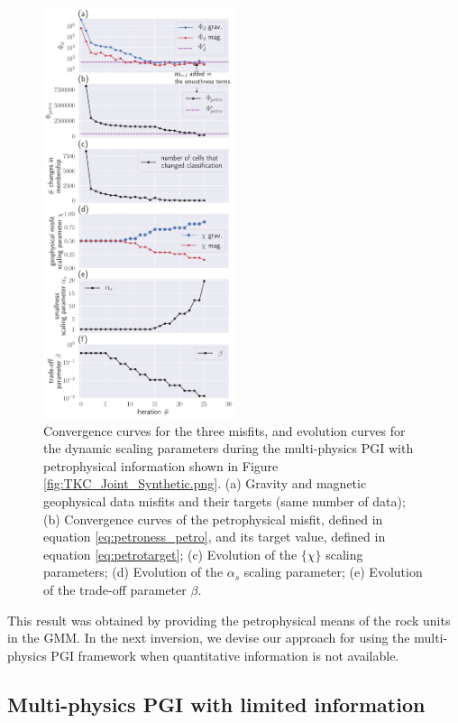 \documentclass[extra, mreferee]{gji_joint} %
\begin{document}
\begin{figure}
\centering
\includegraphics[width=0.5\textwidth]{./Fig/LowRes/TKC_ConvergenceCurves.png}
\caption{Convergence curves for the three misfits, and evolution curves for the dynamic scaling parameters during the multi-physics PGI with petrophysical information shown in Figure \ref{fig:TKC_Joint_Synthetic.png}. (a) Gravity and magnetic geophysical data misfits and their targets (same number of data); (b) Convergence curves of the petrophysical misfit, defined in equation \eqref{eq:petroness_petro}, and its target value, defined in equation \eqref{eq:petrotarget}; (c) Evolution of the $\{\chi\}$ scaling parameters; (d) Evolution of the $\alpha_s$ scaling parameter; (e) Evolution of the trade-off parameter $\beta$.}
\label{fig:TKC_ConvergenceCurves.png}
\end{figure}


This result was obtained by providing the petrophysical means of the rock units in the GMM. In the next inversion, we devise our approach for using the multi-physics PGI framework when quantitative information is not available.

\subsection{Multi-physics PGI with limited information}
\end{document}
